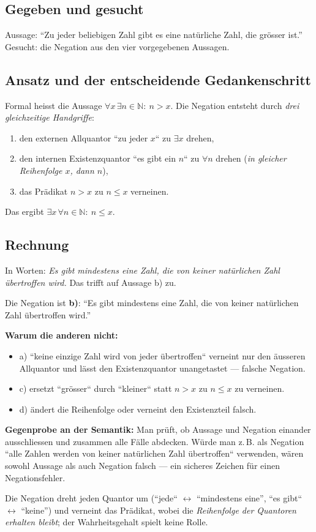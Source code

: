 

\subsection*{Gegeben und gesucht}
Aussage: ``Zu jeder beliebigen Zahl gibt es eine natürliche Zahl, die
grösser ist.'' Gesucht: die Negation aus den vier vorgegebenen Aussagen.

\subsection*{Ansatz und der entscheidende Gedankenschritt}
Formal heisst die Aussage $\forall x\,\exists n\in\mathbb N:\ n>x$. Die
Negation entsteht durch \emph{drei gleichzeitige Handgriffe}:
\begin{enumerate}
  \item den externen Allquantor ``zu jeder $x$`` zu $\exists x$ drehen,
  \item den internen Existenzquantor ``es gibt ein $n$`` zu
        $\forall n$ drehen (\emph{in gleicher Reihenfolge $x$, dann $n$}),
  \item das Prädikat $n>x$ zu $n\le x$ verneinen.
\end{enumerate}
Das ergibt $\exists x\,\forall n\in\mathbb N:\ n\le x$.

\subsection*{Rechnung}
In Worten: \emph{Es gibt mindestens eine Zahl, die von keiner
natürlichen Zahl übertroffen wird.} Das trifft auf Aussage b) zu.

\begin{ergebnis}
Die Negation ist \textbf{b)}: ``Es gibt mindestens eine Zahl, die von
keiner natürlichen Zahl übertroffen wird.''
\end{ergebnis}

\begin{kontrolle}
\textbf{Warum die anderen nicht:}
\begin{itemize}
  \item a) ``keine einzige Zahl wird von jeder übertroffen`` verneint nur
        den äusseren Allquantor und lässt den Existenzquantor unangetastet
        --- falsche Negation.
  \item c) ersetzt ``grösser`` durch ``kleiner`` statt $n>x$ zu $n\le x$
        zu verneinen.
  \item d) ändert die Reihenfolge oder verneint den Existenzteil falsch.
\end{itemize}
\textbf{Gegenprobe an der Semantik:} Man prüft, ob Aussage und Negation
einander ausschliessen und zusammen alle Fälle abdecken. Würde man z.\,B.
als Negation ``alle Zahlen werden von keiner natürlichen Zahl
übertroffen`` verwenden, wären sowohl Aussage als auch Negation falsch
--- ein sicheres Zeichen für einen Negationsfehler.
\end{kontrolle}

\begin{merksatz}
Die Negation dreht jeden Quantor um (``jede`` $\leftrightarrow$
``mindestens eine'', ``es gibt`` $\leftrightarrow$ ``keine'') und
verneint das Prädikat, wobei die \emph{Reihenfolge der Quantoren erhalten
bleibt}; der Wahrheitsgehalt spielt keine Rolle.
\end{merksatz}
